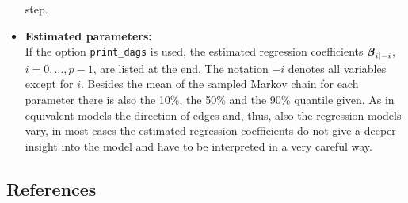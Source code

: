\begin{itemize}
step.
\item {\bf\sffamily Estimated parameters:}\\
If the option {\tt print\_dags} is used, the estimated regression
coefficients $\mbox{\boldmath $\beta$}_{i \mid -i}$, $i=0, \dots, p-1$, are listed
at the end. The notation $-i$ denotes all variables except for
$i$. Besides the mean of the sampled Markov chain for each
parameter there is also the 10\%, the 50\% and the 90\% quantile
given. As in equivalent models the direction of edges and, thus,
also the regression models vary, in most cases the estimated
regression coefficients do not give a deeper insight into the
model and have to be interpreted in a very careful way.
\end{itemize}

\subsection{References}

